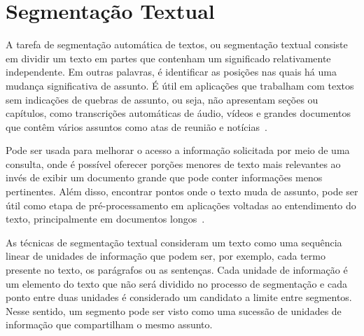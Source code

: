 
\section{Segmentação Textual} \label{sec:segmentacao}






A tarefa de segmentação automática de textos, ou segmentação textual consiste em dividir um texto em partes que contenham um significado relativamente independente. Em outras palavras, é identificar as posições nas quais há uma mudança significativa de assunto. É útil em aplicações que trabalham com textos sem indicações de quebras de assunto, ou seja, não apresentam seções ou capítulos, como transcrições automáticas de áudio, vídeos e grandes documentos que contêm vários assuntos como atas de reunião e notícias~\cite{Aggarwal2018, bokaei2015a, sakahara2014a, misra2009a, Eis2008}.

Pode ser usada para melhorar o acesso a informação solicitada por meio de uma consulta, onde é possível oferecer porções menores de texto mais relevantes ao invés de exibir um documento grande que pode conter informações menos pertinentes.  Além disso, encontrar pontos onde o texto muda de assunto, pode ser útil como etapa de pré-processamento em aplicações voltadas ao entendimento do texto, principalmente em documentos longos~\cite{Choi2000a}.

As técnicas de segmentação textual consideram um texto como uma sequência linear de unidades de informação que podem ser, por exemplo, cada termo presente no texto, os parágrafos ou as sentenças. Cada unidade de informação é um elemento do texto que não será dividido no processo de segmentação e cada ponto entre duas unidades é considerado um candidato a limite entre segmentos. Nesse sentido, um segmento pode ser visto como uma sucessão de unidades de informação que compartilham o mesmo assunto.

















